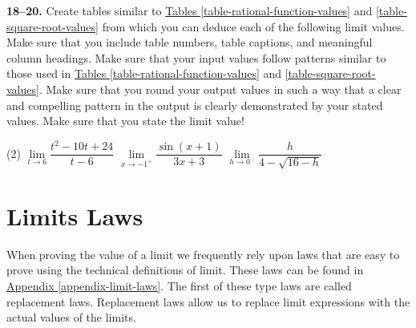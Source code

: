 \documentclass[10pt,oneside,]{book}
\theoremstyle{plain}
\theoremstyle{definition}
\numberwithin{equation}{section}
\begin{document}
\par\smallskip\noindent
\textbf{18--20. }\hypertarget{exercisegroup-15}{\null}Create tables similar to \hyperref[table-rational-function-values]{Tables \ref{table-rational-function-values}} and \hyperref[table-square-root-values]{\ref{table-square-root-values}} from which you can deduce each of the following limit values. Make sure that you include table numbers, table captions, and meaningful column headings. Make sure that your input values follow patterns similar to those used in \hyperref[table-rational-function-values]{Tables \ref{table-rational-function-values}} and \hyperref[table-square-root-values]{\ref{table-square-root-values}}. Make sure that you round your output values in such a way that a clear and compelling pattern in the output is clearly demonstrated by your stated values. Make sure that you state the limit value!%
\par
\begin{exercisegroup}(2)
\exercise[18.]\hypertarget{exercise-63}{\null}\(\lim\limits_{t\to6}\dfrac{t^2-10t+24}{t-6}\)%
\exercise[19.]\hypertarget{exercise-64}{\null}\(\lim\limits_{x\to-1^{+}}\dfrac{\sin(x+1)}{3x+3}\)%
\exercise[20.]\hypertarget{exercise-65}{\null}\(\lim\limits_{h\to0^{-}}\dfrac{h}{4-\sqrt{16-h}}\)%
\end{exercisegroup}
\par\smallskip\noindent
\typeout{************************************************}
\typeout{************************************************}
\section[Limits Laws]{Limits Laws}\label{section-limit-laws}
When proving the value of a limit we frequently rely upon laws that are easy to prove using the technical definitions of limit. These laws can be found in \hyperref[appendix-limit-laws]{Appendix \ref{appendix-limit-laws}}. The first of these type laws are called replacement laws. Replacement laws allow us to replace limit expressions with the actual values of the limits.%
\typeout{************************************************}
\typeout{************************************************}
\end{document}
